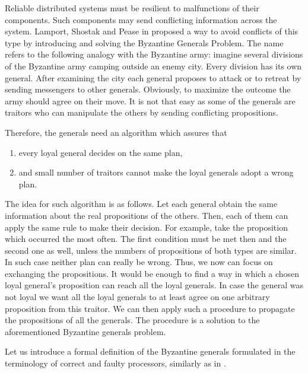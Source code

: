 Reliable distributed systems must be resilient to malfunctions of their components. Such components may send conflicting information across the system. Lamport, Shostak and Pease in \cite{LSP82} proposed a way to avoid conflicts of this type by introducing and solving the Byzantine Generals Problem. The name refers to the following analogy with the Byzantine army: imagine several divisions of the Byzantine army camping outside an enemy city. Every division has its own general. After examining the city each general proposes to attack or to retreat by sending messengers to other generals. Obviously, to maximize the outcome the army should agree on their move. It is not that easy as some of the generals are traitors who can manipulate the others by sending conflicting propositions.

Therefore, the generals need an algorithm which assures that
\begin{enumerate}
    \item every loyal general decides on the same plan,
    \item and small number of traitors cannot make the loyal generals adopt a wrong plan.
\end{enumerate}

The idea for such algorithm is as follows. Let each general obtain the same information about the real propositions of the others. Then, each of them can apply the same rule to make their decision. For example, take the proposition which occurred the most often. The first condition must be met then and the second one as well, unless the numbers of propositions of both types are similar. In such case neither plan can really be wrong. Thus, we now can focus on exchanging the propositions. It would be enough to find a way in which a chosen loyal general's proposition can reach all the loyal generals. In case the general was not loyal we want all the loyal generals to at least agree on one arbitrary proposition from this traitor. We can then apply such a procedure to propagate the propositions of all the generals. The procedure is a solution to the aforementioned Byzantine generals problem.

Let us introduce a formal definition of the Byzantine generals formulated in the terminology of correct and faulty processors, similarly as in \cite{KS08}.

